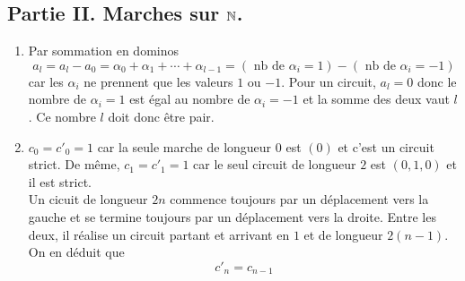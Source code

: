 \subsection*{Partie II. Marches sur $\mathbb{N}$.}
\begin{enumerate}
  \item Par sommation en dominos 
\begin{displaymath}
a_l=a_l -a_0 = \alpha_0 + \alpha_1 + \cdots + \alpha_{l-1} 
= (\text{ nb de $\alpha_i = 1$}) - (\text{ nb de $\alpha_i =-1$}) 
\end{displaymath}
car les $\alpha_i$ ne prennent que les valeurs $1$ ou $-1$. Pour un circuit, $a_l=0$ donc le nombre de $\alpha_i=1$ est égal au nombre de $\alpha_i=-1$ et la somme des deux vaut $l$. Ce nombre $l$ doit donc être pair.

  \item $c_0=c'_0=1$ car la seule marche de longueur $0$ est $(0)$ et c'est un circuit strict. De même, $c_1=c'_1=1$ car le seul circuit de longueur $2$ est $(0,1,0)$ et il est strict.\\
Un cicuit de longueur $2n$ commence toujours par un déplacement vers la gauche et se termine toujours par un déplacement vers la droite. Entre les deux, il réalise un circuit partant et arrivant en $1$ et de longueur $2(n-1)$. On en déduit que 
\begin{displaymath}
  c'_n = c_{n-1}
\end{displaymath}
  

\end{enumerate}
